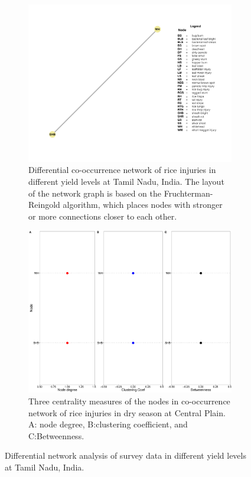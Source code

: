  \begin{figure}
    \centering
    \begin{subfigure}[b]{1\textwidth}
        \includegraphics[width = 1\textwidth]{figures/difyieldTM.pdf}
        \caption[Differential co-occurrence network of rice injuries in different yield levels at Tamil Nadu, India.]{Differential co-occurrence network of rice injuries in different yield levels at Tamil Nadu, India. The layout of the network graph is based on the Fruchterman-Reingold algorithm, which places nodes with stronger or more connections closer to each other.}
        \label{fig:difyieldnetwork_TM}
    \end{subfigure}
    \begin{subfigure}[b]{1\textwidth}
        \includegraphics[width = 1\textwidth]{figures/yield_dif_nodepropTamil_Nadu.pdf}
        \caption{Three centrality measures of the nodes in co-occurrence network of rice injuries in dry season at Central Plain. A: node degree, B:clustering coefficient, and C:Betweenness.}
        \label{fig:nodepropdifyield_TM}
    \end{subfigure}
    \caption{Differential network analysis of survey data in different yield levels at Tamil Nadu, India.}
    \label{fig:yielddif_TM}
\end{figure}
 
